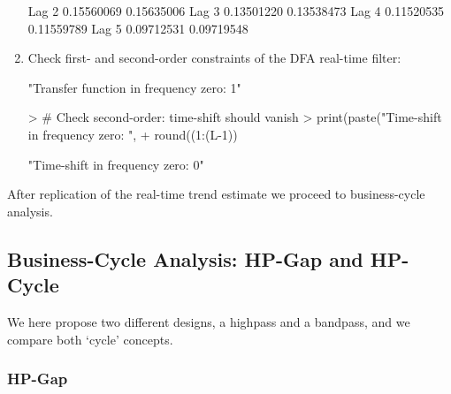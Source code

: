\documentclass[a4paper]{book}
\begin{document}
\begin{enumerate}
\begin{Schunk}
\begin{Soutput}
Lag  2         0.15560069   0.15635006
Lag  3         0.13501220   0.13538473
Lag  4         0.11520535   0.11559789
Lag  5         0.09712531   0.09719548
\end{Soutput}
\end{Schunk}
\item Check first- and second-order constraints of the DFA real-time filter:
\begin{Schunk}
\begin{Soutput}
[1] "Transfer function in frequency zero: 1"
\end{Soutput}
\begin{Sinput}
> # Check second-order: time-shift should vanish
> print(paste("Time-shift in frequency zero: ",
+             round((1:(L-1))%
\end{Sinput}
\begin{Soutput}
[1] "Time-shift in frequency zero: 0"
\end{Soutput}
\end{Schunk}
\end{enumerate}
After replication of the real-time trend estimate we proceed to business-cycle analysis.



\subsection{Business-Cycle Analysis: HP-Gap and HP-Cycle}

We here propose two different designs, a highpass and a bandpass, and we compare both `cycle' concepts.

\subsubsection{HP-Gap}
\end{document}
